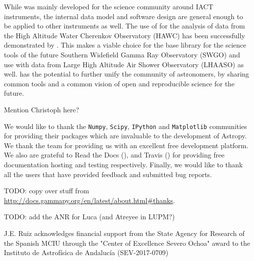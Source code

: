 \documentclass[traditabstract, longauth]{aa}
\begin{document}
While \gammapy was mainly developed for the science community around
IACT instruments, the internal data model and software design are general
enough to be applied to other \gammaray instruments as well.
The use of \gammapy for the analysis of data from the High Altitude
Water Cherenkov Observatory (HAWC) has been successfully
demonstrated by \cite{Olivera2022}. This makes \gammapy
a viable choice for the base library for the science tools
of the future Southern Widefield Gamma Ray Observatory
(SWGO) and use with data from Large High Altitude Air Shower Observatory (LHAASO) as well. \gammapy
has the potential to further unify the community
of \gammaray astronomers, by sharing common tools and
a common vision of open and reproducible science for the future.

\begin{acknowledgements}

	Mention Christoph here?

	We would like to thank the \texttt{Numpy}, \texttt{Scipy}, \texttt{IPython} and
	\texttt{Matplotlib} communities for providing their packages which are
	invaluable to the development of Astropy. We thank the \github team for
	providing us with an excellent free development platform. We also are grateful
	to Read the Docs (\ReadthedocsUrl), and Travis (\TravisUrl) for providing free
	documentation hosting and testing respectively. Finally, we would like to thank
	all the \gammapy users that have provided feedback and submitted bug reports.

	TODO: copy over stuff from
	\url{http://docs.gammapy.org/en/latest/about.html#thanks}.

	TODO: add the ANR for Luca (and Atreyee in LUPM?)

	J.E. Ruiz acknowledges financial support from the State Agency for Research of
	the Spanish MCIU through the "Center of Excellence Severo Ochoa" award to the
	Instituto de Astrof\'isica de Andaluc\'ia (SEV-2017-0709)

\end{acknowledgements}




\end{document}
